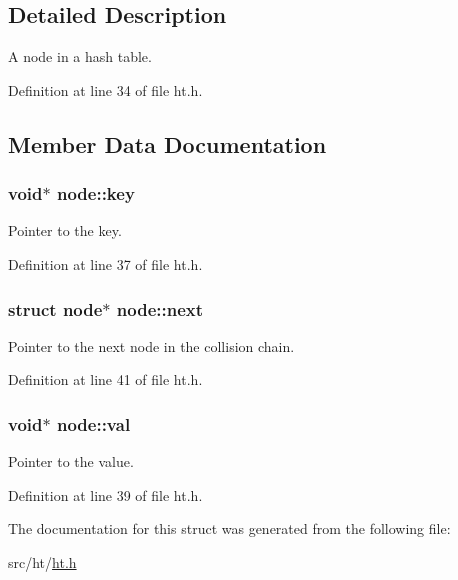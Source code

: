 \subsection{Detailed Description}
A node in a hash table. 

Definition at line 34 of file ht.h.



\subsection{Member Data Documentation}
\hypertarget{structnode_a72c8a0c41b801c92db89c5078642f28b}{
\subsubsection[{key}]{\setlength{\rightskip}{0pt plus 5cm}void$\ast$ {\bf node::key}}}
\label{structnode_a72c8a0c41b801c92db89c5078642f28b}


Pointer to the key. 



Definition at line 37 of file ht.h.

\hypertarget{structnode_aa3e8aa83f864292b5a01210f4453fcc0}{
\subsubsection[{next}]{\setlength{\rightskip}{0pt plus 5cm}struct {\bf node}$\ast$ {\bf node::next}}}
\label{structnode_aa3e8aa83f864292b5a01210f4453fcc0}


Pointer to the next node in the collision chain. 



Definition at line 41 of file ht.h.

\hypertarget{structnode_a3866f55c05d50265b730d8cdeec0a1f8}{
\subsubsection[{val}]{\setlength{\rightskip}{0pt plus 5cm}void$\ast$ {\bf node::val}}}
\label{structnode_a3866f55c05d50265b730d8cdeec0a1f8}


Pointer to the value. 



Definition at line 39 of file ht.h.



The documentation for this struct was generated from the following file:\begin{DoxyCompactItemize}
\item 
src/ht/\hyperlink{ht_8h}{ht.h}\end{DoxyCompactItemize}
